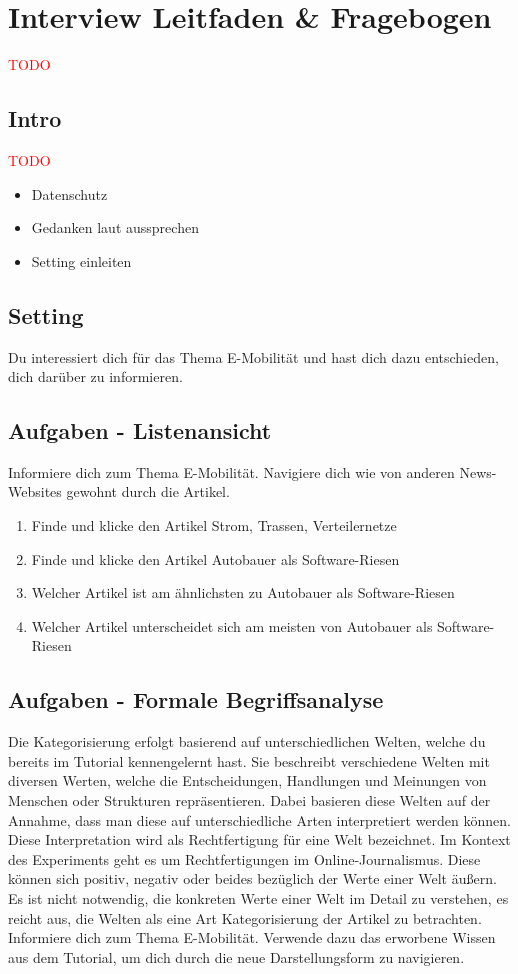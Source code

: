 \section{Interview Leitfaden \& Fragebogen}
\textcolor{red}{TODO}

\subsection{Intro}
\textcolor{red}{TODO}
\begin{itemize}
    \item Datenschutz
    \item Gedanken laut aussprechen
    \item Setting einleiten
\end{itemize}

\subsection{Setting}
Du interessiert dich für das Thema E-Mobilität und hast dich dazu entschieden, dich darüber zu informieren.

\subsection{Aufgaben - Listenansicht}
Informiere dich zum Thema E-Mobilität. Navigiere dich wie von anderen News-Websites gewohnt durch die Artikel.
\begin{enumerate}
    \item Finde und klicke den Artikel \glqq Strom, Trassen, Verteilernetze\grqq{}
    \item Finde und klicke den Artikel \glqq Autobauer als Software-Riesen\grqq{}
    \item Welcher Artikel ist am ähnlichsten zu \glqq Autobauer als Software-Riesen\grqq{}
    \item Welcher Artikel unterscheidet sich am meisten von \glqq Autobauer als Software-Riesen\grqq{}
\end{enumerate}

\subsection{Aufgaben - Formale Begriffsanalyse}
Die Kategorisierung erfolgt basierend auf unterschiedlichen Welten, welche du bereits im Tutorial kennengelernt hast.
Sie beschreibt verschiedene Welten mit diversen Werten, welche die Entscheidungen, Handlungen und Meinungen von Menschen oder Strukturen repräsentieren.
Dabei basieren diese Welten auf der Annahme, dass man diese auf unterschiedliche Arten interpretiert werden können.
Diese Interpretation wird als Rechtfertigung für eine Welt bezeichnet.
Im Kontext des Experiments geht es um Rechtfertigungen im Online-Journalismus.
Diese können sich positiv, negativ oder beides bezüglich der Werte einer Welt äußern.
Es ist nicht notwendig, die konkreten Werte einer Welt im Detail zu verstehen, es reicht aus, die Welten als eine Art Kategorisierung der Artikel zu betrachten.
Informiere dich zum Thema E-Mobilität. Verwende dazu das erworbene Wissen aus dem Tutorial, um dich durch die neue Darstellungsform zu navigieren.

